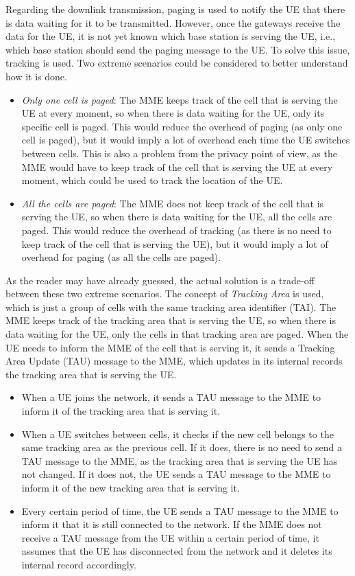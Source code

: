     Regarding the downlink transmission, paging is used to notify the UE that there is data waiting for it to be transmitted. However, once the gateways receive the data for the UE, it is not yet known which base station is serving the UE, i.e., which base station should send the paging message to the UE. To solve this issue, tracking is used. Two extreme scenarios could be considered to better understand how it is done.
    \begin{itemize}
        \item \emph{Only one cell is paged}: The MME keeps track of the cell that is serving the UE at every moment, so when there is data waiting for the UE, only its specific cell is paged. This would reduce the overhead of paging (as only one cell is paged), but it would imply a lot of overhead each time the UE switches between cells. This is also a problem from the privacy point of view, as the MME would have to keep track of the cell that is serving the UE at every moment, which could be used to track the location of the UE.
        \item \emph{All the cells are paged}: The MME does not keep track of the cell that is serving the UE, so when there is data waiting for the UE, all the cells are paged. This would reduce the overhead of tracking (as there is no need to keep track of the cell that is serving the UE), but it would imply a lot of overhead for paging (as all the cells are paged).
    \end{itemize}

    As the reader may have already guessed, the actual solution is a trade-off between these two extreme scenarios. The concept of \emph{Tracking Area} is used, which is just a group of cells with the same tracking area identifier (TAI). The MME keeps track of the tracking area that is serving the UE, so when there is data waiting for the UE, only the cells in that tracking area are paged. When the UE needs to inform the MME of the cell that is serving it, it sends a Tracking Area Update (TAU) message to the MME, which updates in its internal records the tracking area that is serving the UE.
    \begin{itemize}
        \item When a UE joins the network, it sends a TAU message to the MME to inform it of the tracking area that is serving it.
        \item When a UE switches between cells, it checks if the new cell belongs to the same tracking area as the previous cell. If it does, there is no need to send a TAU message to the MME, as the tracking area that is serving the UE has not changed. If it does not, the UE sends a TAU message to the MME to inform it of the new tracking area that is serving it.
        \item Every certain period of time, the UE sends a TAU message to the MME to inform it that it is still connected to the network. If the MME does not receive a TAU message from the UE within a certain period of time, it assumes that the UE has disconnected from the network and it deletes its internal record accordingly.
    \end{itemize}

